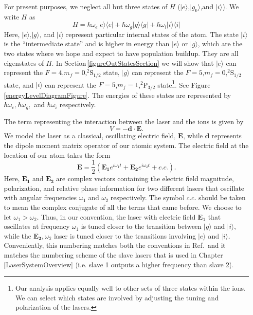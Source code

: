 For present purposes, we neglect all but three states of $H$ ($|e\rangle$,$|g_0\rangle$,and $|i\rangle$). We write $H$ as 
\begin{equation}
H=
\hbar\omega_e |e\rangle\langle e | +
\hbar\omega_g |g\rangle\langle g | +
\hbar\omega_i |i\rangle\langle i | 
\end{equation}
Here, $|e\rangle$,$|g\rangle$, and $|i\rangle$ represent particular internal states of the atom. The state $|i\rangle$ is the ``intermediate state'' and is higher in energy than $|e\rangle$ or $|g\rangle$, which are the two states where we hope and expect to have population buildup. They are all eigenstates of $H$. In Section\,\ref{figureOutStatesSection} we will show that $|e\rangle$ can represent the $F=4$,$m_f=0$,$^2$S$_{1/2}$ state, $|g\rangle$ can represent the $F=5$,$m_f=0$,$^2$S$_{1/2}$ state, and $|i\rangle$ can represent the $F=5$,$m_f=1$,$^2$P$_{3/2}$ state\footnote{Our analysis applies equally well to other sets of three states within the ions. We can select which states are involved by adjusting the tuning and polarization of the lasers.}. See Figure\,\ref{energyLevelDiagramFigure}. The energies of these states are represented by $\hbar\omega_e,\hbar\omega_g,$ and $\hbar\omega_i$ respectively. 

The term representing the interaction between the laser and the ions is given by
\begin{equation}
V=-\mathbf{d}\cdot\mathbf{E}.
\end{equation}
We model the laser as a classical, oscillating electric field, $\mathbf{E}$, while $\mathbf{d}$ represents the dipole moment matrix operator of our atomic system. The electric field at the location of our atom takes the form 
\begin{equation}
\mathbf{E}=\frac{1}{2}\left(\mathbf{E_1} e^{i\omega_1 t} + \mathbf{E_2} e^{i\omega_2 t} + c.c. \right). \label{eqn:Efield}
\end{equation}
Here, $\mathbf{E_1}$ and $\mathbf{E_2}$ are complex vectors containing the electric field magnitude, polarization, and relative phase information for two different lasers that oscillate with angular frequencies $\omega_1$ and $\omega_2$ respectively. The symbol $c.c.$ should be taken to mean the complex conjugate of all the terms that came before. We choose to let $\omega_1>\omega_2$. 
Thus, in our convention, the laser with electric field $\mathbf{E_1}$ that oscillates at frequency $\omega_1$ is tuned closer to the transition between $|g\rangle$ and $|i\rangle$, while the $\mathbf{E_2}, \omega_2$ laser is tuned closer to the transitions involving $|e\rangle$ and $|i\rangle$. Conveniently, this numbering matches both the conventions in Ref.\,\cite{Young1997363} and it matches the numbering scheme of the slave lasers that is used in Chapter\,\ref{LaserSystemOverview} (i.e. slave 1 outputs a higher frequency than slave 2). 

